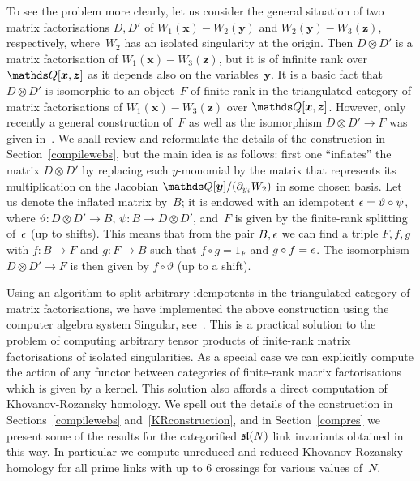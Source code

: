 \documentclass{compositio}
\theoremstyle{definition}
\numberwithin{equation}{section}
\begin{document}
To see the problem more clearly, let us consider the general situation of two matrix factorisations $D,D'$ of $W_{1}(\boldsymbol{x})-W_{2}(\boldsymbol{y})$ and $W_{2}(\boldsymbol{y})-W_{3}(\boldsymbol{z})$, respectively, where~$W_{2}$ has an isolated singularity at the origin. Then $D\otimes D'$ is a matrix factorisation of $W_{1}(\boldsymbol{x})-W_{3}(\boldsymbol{z})$, but it is of infinite rank over $\nQ[\boldsymbol{x},\boldsymbol{z}]$ as it depends also on the variables~$\boldsymbol{y}$. It is a basic fact that $D\otimes D'$ is isomorphic to an object~$F$ of finite rank in the triangulated category of matrix factorisations of $W_{1}(\boldsymbol{x})-W_{3}(\boldsymbol{z})$ over $\nQ[\boldsymbol{x},\boldsymbol{z}]$. However, only recently a general construction of~$F$ as well as the isomorphism $D\otimes D'\longrightarrow F$ was given in~\cite{dm1102.2957}. We shall review and reformulate the details of the construction in Section~\ref{compilewebs}, but the main idea is as follows:  first one ``inflates'' the matrix $D\otimes D'$ by replacing each $y$-monomial by the matrix that represents its multiplication on the Jacobian $\nQ[\boldsymbol{y}]/(\partial_{y_{i}} W_{2})$ in some chosen basis. Let us denote the inflated matrix by~$B$; it is endowed with an idempotent $\epsilon=\vartheta\circ\psi$, where $\vartheta: D\otimes D'\longrightarrow B$, $\psi: B\longrightarrow D\otimes D'$, and~$F$ is given by the finite-rank splitting of~$\epsilon$ (up to shifts). This means that from the pair $B,\epsilon$ we can find a triple $F,f,g$ with $f:B\longrightarrow F$ and $g:F\longrightarrow B$ such that $f\circ g=1_{F}$ and $g\circ f=\epsilon$. The isomorphism $D\otimes D'\longrightarrow F$ is then given by $f\circ\vartheta$ (up to a shift). 

Using an algorithm to split arbitrary idempotents in the triangulated category of matrix factorisations, we have implemented the above construction using the computer algebra system Singular, see~\cite{cmWebCompileCode}. This is a practical solution to the problem of computing arbitrary tensor products of finite-rank matrix factorisations of isolated singularities. As a special case we can explicitly compute the action of any functor between categories of finite-rank matrix factorisations which is given by a kernel. This solution also affords a direct computation of Khovanov-Rozansky homology. We spell out the details of the construction in Sections~\ref{compilewebs} and~\ref{KRconstruction}, and in Section~\ref{compres} we present some of the results for the categorified $\mathfrak{sl}(N)$ link invariants obtained in this way. In particular we compute unreduced and reduced Khovanov-Rozansky homology for all prime links with up to 6 crossings for various values of~$N$. 
\end{document}
